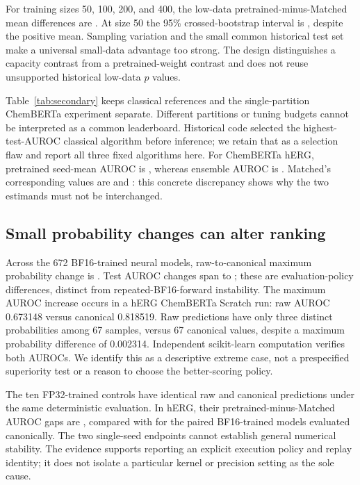 \documentclass[runningheads,a4paper]{llncs}
\begin{document}
For training sizes 50, 100, 200, and 400, the low-data pretrained-minus-Matched mean differences are \LowDeltas{}. At size 50 the 95\% crossed-bootstrap interval is \LowFiftyCI{}, despite the positive mean. Sampling variation and the small common historical test set make a universal small-data advantage too strong. The design distinguishes a capacity contrast from a pretrained-weight contrast and does not reuse unsupported historical low-data $p$ values.



Table~\ref{tab:secondary} keeps classical references and the single-partition ChemBERTa experiment separate. Different partitions or tuning budgets cannot be interpreted as a common leaderboard. Historical code selected the highest-test-AUROC classical algorithm before inference; we retain that as a selection flaw and report all three fixed algorithms here. For ChemBERTa hERG, pretrained seed-mean AUROC is \HfHergSeed{}, whereas ensemble AUROC is \HfHergEnsemble{}. Matched's corresponding values are \HfRandomSeed{} and \HfRandomEnsemble{}: this concrete discrepancy shows why the two estimands must not be interchanged.

\subsection{Small probability changes can alter ranking}
Across the 672 BF16-trained neural models, raw-to-canonical maximum probability change is \MaxProbDrift{}. Test AUROC changes span \TestDriftMin{} to \TestDriftMax{}; these are evaluation-policy differences, distinct from repeated-BF16-forward instability. The maximum AUROC increase occurs in a hERG ChemBERTa Scratch run: raw AUROC 0.673148 versus canonical 0.818519. Raw predictions have only three distinct probabilities among 67 samples, versus 67 canonical values, despite a maximum probability difference of 0.002314. Independent scikit-learn computation verifies both AUROCs. We identify this as a descriptive extreme case, not a prespecified superiority test or a reason to choose the better-scoring policy.

The ten FP32-trained controls have identical raw and canonical predictions under the same deterministic evaluation. In hERG, their pretrained-minus-Matched AUROC gaps are \FpHergGaps{}, compared with \BfHergGaps{} for the paired BF16-trained models evaluated canonically. The two single-seed endpoints cannot establish general numerical stability. The evidence supports reporting an explicit execution policy and replay identity; it does not isolate a particular kernel or precision setting as the sole cause.
\end{document}
